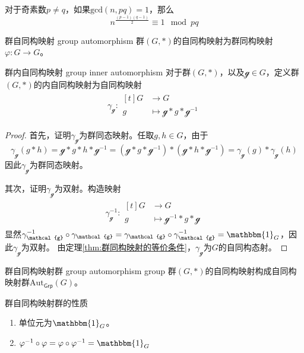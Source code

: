 \begin{corollary}
	对于奇素数$p\ne q$，如果$\text{gcd}(n,pq)=1$，那么
	\[ 
	n^{\frac{(p-1)(q-1)}{2}}\equiv 1\mod pq
	 \]
\end{corollary}

\begin{definition}{群自同构映射 group automorphism}
	群$(G,*)$的自同构映射为群同构映射$\varphi:G\to G$。
\end{definition}

\begin{definition}{群内自同构映射 group inner automorphism}
	对于群$(G,*)$，以及$\mathcal{g}\in G$，定义群$(G,*)$的内自同构映射为自同构映射
	\begin{align*}
		\gamma_\mathcal{g}:
		\begin{aligned}[t]
			G&\longrightarrow G\\
			g&\longmapsto \mathcal{g}*g*\mathcal{g}^{-1}
		\end{aligned}
	\end{align*}
\end{definition}

\begin{proof}
	首先，证明$\gamma_\mathcal{g}$为群同态映射。任取$g,h\in G$，由于
	\[ 
	\gamma_\mathcal{g}(g*h)=\mathcal{g}*g*h*\mathcal{g}^{-1}=(\mathcal{g}*g*\mathcal{g}^{-1})*(\mathcal{g}*h*\mathcal{g}^{-1})=\gamma_\mathcal{g}(g)*\gamma_\mathcal{g}(h)
	 \]
	 因此$\gamma_\mathcal{g}$为群同态映射。
	 
	 其次，证明$\gamma_\mathcal{g}$为双射。构造映射
	 \begin{align*}
	 	\gamma_\mathcal{g}^{-1}:
	 	\begin{aligned}[t]
	 		G&\longrightarrow G\\
	 		g&\longmapsto \mathcal{g}^{-1}*g*\mathcal{g}
	 	\end{aligned}
 	\end{align*}
	 显然$\gamma_\mathcal{g}^{-1}\circ \gamma_\mathcal{g}=\gamma_\mathcal{g}\circ \gamma_\mathcal{g}^{-1}=\mathbbm{1}_G$，因此$\gamma_\mathcal{g}$为双射。
	 由定理\ref{thm:群同构映射的等价条件}，$\gamma_\mathcal{g}$为$G$的自同构态射。
\end{proof}

\begin{definition}{群自同构映射群 group automorphism group}
	群$(G,*)$的自同构映射构成自同构映射群$\mathrm{Aut}_{\mathsf{Grp}}(G)$。
\end{definition}

\begin{proposition}{群自同构映射群的性质}
	\begin{enumerate}
		\item 单位元为$\mathbbm{1}_G$。
		\item $\varphi^{-1}\circ \varphi=\varphi\circ\varphi^{-1}=\mathbbm{1}_G$
	\end{enumerate}
\end{proposition}

